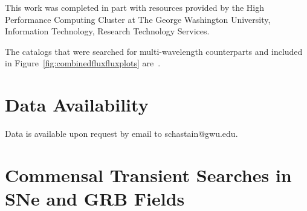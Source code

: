 \documentclass[12pt]{article}
\begin{document}
This work was completed in part with resources provided by the High Performance Computing Cluster at The George Washington University, Information Technology, Research Technology Services.

The catalogs that were searched for multi-wavelength counterparts and included in Figure~\ref{fig:combinedfluxfluxplots} are~\citet{vizier:V/156,vizier:V/154,vizier:J/ApJS/249/18,vizier:J/ApJ/794/120,vizier:J/A+A/540/A106,vizier:II/371,vizier:II/358,vizier:II/349,2006AJ....131.1163S,vizier:II/367,vizier:II/319,vizier:II/246,vizier:B/denis,vizier:J/ApJS/225/1,vizier:II/363,vizier:II/328,vizier:II/311,1998AJ....115.1693C,vizier:VIII/92}.

\section*{Data Availability}


Data is available upon request by email to schastain@gwu.edu.






\newpage
\section{Commensal Transient Searches in SNe and GRB Fields}
\end{document}

